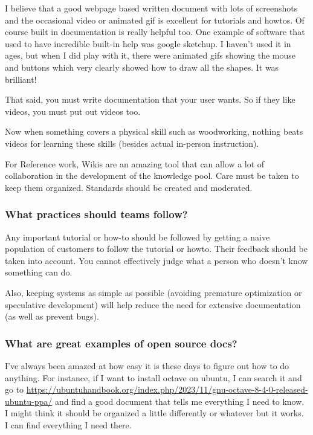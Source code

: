 \documentclass[letter,12pt]{article}
\begin{document}
I believe that a good webpage based written document with lots of screenshots and the occasional video or animated gif is excellent for tutorials and howtos. Of course built in documentation is really helpful too. One example of software that used to have incredible built-in help was google sketchup. I haven't used it in ages, but when I did play with it, there were animated gifs showing the mouse and buttons which very clearly showed how to draw all the shapes. It was brilliant!

That said, you must write documentation that your user wants. So if they like videos, you must put out videos too.

Now when something covers a physical skill such as woodworking, nothing beats videos for learning these skills (besides actual in-person instruction).

For Reference work, Wikis are an amazing tool that can allow a lot of collaboration in the development of the knowledge pool. Care must be taken to keep them organized. Standards should be created and moderated.

\subsubsection{What practices should teams follow?}
Any important tutorial or how-to should be followed by getting a naive population of customers to follow the tutorial or howto. Their feedback should be taken into account. You cannot effectively judge what a person who doesn't know something can do.

Also, keeping systems as simple as possible (avoiding premature optimization or speculative development) will help reduce the need for extensive documentation (as well as prevent bugs).

\subsubsection{What are great examples of open source docs?}
I've always been amazed at how easy it is these days to figure out how to do anything. For instance, if I want to install octave on ubuntu, I can search it and go to \href{https://ubuntuhandbook.org/index.php/2023/11/gnu-octave-8-4-0-released-ubuntu-ppa/}{https://ubuntuhandbook.org/index.php/2023/11/gnu-octave-8-4-0-released-ubuntu-ppa/} and find a good document that tells me everything I need to know. I might think it should be organized a little differently or whatever but it works. I can find everything I need there.
\end{document}

